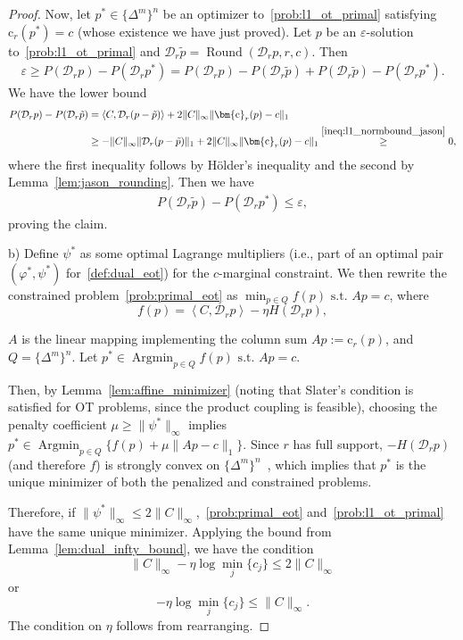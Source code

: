 \documentclass[10pt]{article}
\DeclareMathOperator*{\Argmin}{Argmin}
\newcommand{\inner}[2]{\left\langle #1,#2\right\rangle}
\newcommand{\diag}[1]{\mathcal{D}_{#1}}
\theoremstyle{plain}
\theoremstyle{definition}
\theoremstyle{remark}
\newcommand{\col}{\bm{\mathrm{c}}}
\begin{document}
\begin{proof}
Now, let $p^*\in\{\Delta^m\}^n$ be an optimizer to~\eqref{prob:l1_ot_primal} satisfying $\col_r(p^*)=c$ (whose existence we have just proved). Let $p$ be an $\varepsilon$-solution to~\eqref{prob:l1_ot_primal} and $\diag{r} \tilde p=\operatorname{Round}(\diag{r}p,r,c)$. Then
\begin{align*}
    \varepsilon \geq P(\diag{r}p)-P(\diag{r}p^*)=P(\diag{r}p)-P(\diag{r}\tilde{p})+P(\diag{r}\tilde p)-P(\diag{r}p^*).
\end{align*}
We have the lower bound
\begin{align*}
    P(\diag{r}p)-P(\diag{r}\tilde p)&=\inner{C}{\diag{r}(p-\tilde{p})}+2\|C\|_\infty\|\col_r(p)-c\|_1\\
    &\geq -\|C\|_\infty\|{\diag{r}(p-\tilde{p})}\|_1+2\|C\|_\infty\|\col_r(p)-c\|_1\stackrel{\eqref{ineq:l1_normbound_jason}}\geq 0,
\end{align*}
where the first inequality follows by Hölder's inequality and the second by Lemma~\ref{lem:jason_rounding}.
Then we have
\begin{align*}
     P(\diag{r}\tilde p)-P(\diag{r}p^*) \le \varepsilon,
\end{align*}
proving the claim.

b) 
Define $\psi^*$ as some optimal Lagrange multipliers (i.e., part of an optimal pair $(\varphi^*, \psi^*)$ for~\eqref{def:dual_eot}) for the $c$-marginal constraint. We then rewrite the constrained problem~\eqref{prob:primal_eot} as $\min_{p\in Q} f(p)\text{ s.t. }Ap=c$, where
\[f(p)=\inner{C}{\diag{r}p}-\eta  H(\diag{r}p),\] 

$A$ is the linear mapping implementing the column sum $Ap:=\col_r(p)$, and $Q=\{\Delta^m\}^n$. Let $p^*\in\Argmin_{p\in Q} f(p)\text{ s.t. }Ap=c.$ 

Then, by Lemma~\ref{lem:affine_minimizer} (noting that Slater's condition is satisfied for OT problems, since the product coupling is feasible), choosing the penalty coefficient $\mu\geq \|\psi^*\|_\infty$ implies $p^*\in\Argmin_{p\in Q}\{f(p)+\mu\|Ap-c\|_1\}$. Since $r$ has full support, $-H(\diag{r}p)$ (and therefore $f$) is strongly convex on $\{\Delta^m\}^n$~\cite[Example 5.27]{beckFirstOrderMethodsOptimization2017}, which implies that $p^*$ is the unique minimizer of both the penalized and constrained problems. 

Therefore, if $\|\psi^*\|_\infty\leq 2\|C\|_\infty$,~\eqref{prob:primal_eot} and~\eqref{prob:l1_ot_primal} have the same unique minimizer. Applying the bound from Lemma~\ref{lem:dual_infty_bound}, we have the condition
\begin{equation*}
    \|C\|_\infty - \eta \log\underset{j}\min\{c_j\}\leq 2\|C\|_\infty
\end{equation*}
or
\begin{equation*}
    -\eta \log\min_j\{c_j\}\leq \|C\|_\infty.
\end{equation*}
The condition on $\eta $ follows from rearranging.
\end{proof}
\end{document}
